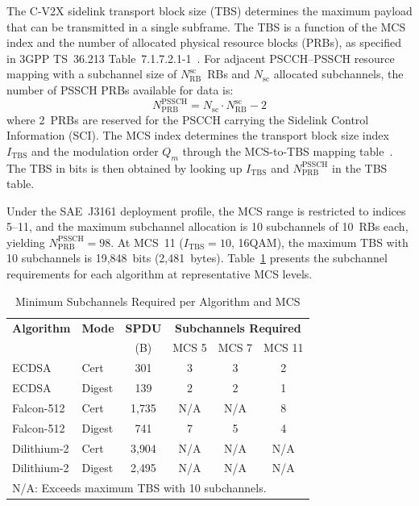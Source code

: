 \documentclass[letterpaper,journal]{IEEEtran}
\begin{document}
The C-V2X sidelink transport block size (TBS) determines the maximum payload that can be transmitted in a single subframe. The TBS is a function of the MCS index and the number of allocated physical resource blocks (PRBs), as specified in 3GPP TS~36.213 Table~7.1.7.2.1-1~\cite{3gpp_36213}. For adjacent PSCCH--PSSCH resource mapping with a subchannel size of $N_\text{RB}^\text{sc}$~RBs and $N_\text{sc}$ allocated subchannels, the number of PSSCH PRBs available for data is:
\begin{equation}
    N_\text{PRB}^\text{PSSCH} = N_\text{sc} \cdot N_\text{RB}^\text{sc} - 2
    \label{eq:nprb}
\end{equation}
where 2~PRBs are reserved for the PSCCH carrying the Sidelink Control Information (SCI). The MCS index determines the transport block size index $I_\text{TBS}$ and the modulation order $Q_m$ through the MCS-to-TBS mapping table~\cite{3gpp_36213}. The TBS in bits is then obtained by looking up $I_\text{TBS}$ and $N_\text{PRB}^\text{PSSCH}$ in the TBS table.

Under the SAE~J3161 deployment profile, the MCS range is restricted to indices 5--11, and the maximum subchannel allocation is 10 subchannels of 10~RBs each, yielding $N_\text{PRB}^\text{PSSCH} = 98$. At MCS~11 ($I_\text{TBS} = 10$, 16QAM), the maximum TBS with 10 subchannels is 19{,}848~bits (2{,}481~bytes). Table~\ref{tab:tbs_feasibility} presents the subchannel requirements for each algorithm at representative MCS levels.

\begin{table}[!htbp]
    \caption{Minimum Subchannels Required per Algorithm and MCS}
    \label{tab:tbs_feasibility}
    \centering
    \begin{tabular}{llcccc}
    \toprule
    \textbf{Algorithm} & \textbf{Mode} & \textbf{SPDU} & \multicolumn{3}{c}{\textbf{Subchannels Required}} \\
     & & (B) & MCS 5 & MCS 7 & MCS 11 \\
    \midrule
    ECDSA       & Cert   & 301   & 3    & 3    & 2    \\
    ECDSA       & Digest & 139   & 2    & 2    & 1    \\
    Falcon-512  & Cert   & 1{,}735 & N/A  & N/A  & 8    \\
    Falcon-512  & Digest & 741   & 7    & 5    & 4    \\
    Dilithium-2 & Cert   & 3{,}904 & N/A  & N/A  & N/A  \\
    Dilithium-2 & Digest & 2{,}495 & N/A  & N/A  & N/A  \\
    \bottomrule
    \multicolumn{6}{l}{\footnotesize N/A: Exceeds maximum TBS with 10 subchannels.}
    \end{tabular}
\end{table}
\end{document}
